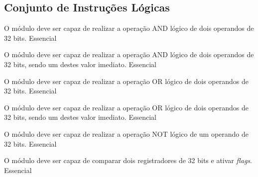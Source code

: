 \subsection{Conjunto de Instruções Lógicas} 
  
    \begin{functional}
    
      {O módulo deve ser capaz de realizar a operação AND lógico de dois operandos de 32 bits.}
      {Essencial}
      
      {O módulo deve ser capaz de realizar a operação AND lógico de dois operandos de 32 bits, sendo um destes valor imediato.}
      {Essencial}

      {O módulo deve ser capaz de realizar a operação OR lógico de dois operandos de 32 bits.}
      {Essencial}  
      
      {O módulo deve ser capaz de realizar a operação OR lógico de dois operandos de 32 bits, sendo um destes valor imediato.}
      {Essencial} 
      
      {O módulo deve ser capaz de realizar a operação NOT lógico de um operando de 32 bits.}
      {Essencial}   
      
      {O módulo deve ser capaz de comparar dois registradores de 32 bits e ativar \textit{flags}.}
      {Essencial}
      
      
      
      
    \end{functional}